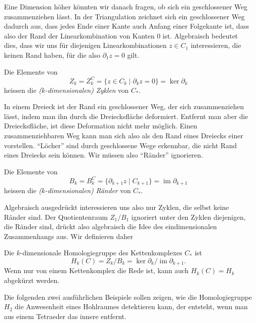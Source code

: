 Eine Dimension höher könnten wir danach fragen, ob sich ein geschlossener
Weg zusammenziehen lässt.
In der Triangulation zeichnet sich ein geschlossener Weg dadurch aus,
dass jedes Ende einer Kante auch Anfang einer Folgekante ist, dass also
der Rand der Linearkombination von Kanten 0 ist.
Algebraisch bedeutet dies, dass wir uns für diejenigen Linearkombinationen
$z\in C_1$ interessieren, die keinen Rand haben, für die also $\partial_1z=0$
gilt.

\begin{definition}
Die Elemente von
\[
Z_k
=
Z_k^C
=
\{z\in C_k\;|\; \partial_k z = 0\}
=
\ker \partial_k
\]
heissen die {\em ($k$-dimensionalen) Zyklen} von $C_*$.
\end{definition}

In einem Dreieck ist der Rand ein geschlossener Weg, der sich zusammenziehen
lässt, indem man ihn durch die Dreiecksfläche deformiert.
Entfernt man aber die Dreiecksfläche, ist diese Deformation nicht mehr
möglich.
Einen zusammenziehbaren Weg kann man sich also als den Rand eines Dreiecks
einer vorstellen.
``Löcher'' sind durch geschlossene Wege erkennbar, die nicht Rand eines
Dreiecks sein können.
Wir müssen also ``Ränder'' ignorieren.

\begin{definition}
Die Elemente von
\[
B_k
=
B_k^C
=
\{\partial_{k+1}z\;|\; C_{k+1}\}
=
\operatorname{im} \partial_{k+1}
\]
heissen die {\em ($k$-dimensionalen) Ränder} von $C_*$.
\end{definition}

Algebraisch ausgedrückt interessieren uns also nur Zyklen, die selbst
keine Ränder sind.
Der Quotientenraum $Z_1/B_1$ ignoriert unter den Zyklen diejenigen, die
Ränder sind, drückt also algebraisch die Idee des eindimensionalen
Zusammenhangs aus.
Wir definieren daher

\begin{definition}
Die $k$-dimensionale Homologiegruppe des Kettenkomplexes $C_*$ ist
\[
H_k(C) = Z_k/B_k = \ker \partial_k / \operatorname{im} \partial_{k+1}.
\]
Wenn nur von einem Kettenkomplex die Rede ist, kann auch $H_k(C)=H_k$
abgekürzt werden.
\end{definition}


Die folgenden zwei ausführlichen Beispiele sollen zeigen, wie die
Homologiegruppe $H_2$ die Anwesenheit eines Hohlraumes detektieren kann,
der entsteht, wenn man aus einem Tetraeder das innere entfernt.

